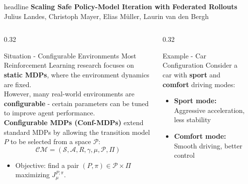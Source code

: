 \documentclass[final,t]{beamer}
\newcommand{\postertitle}{Scaling Safe Policy-Model Iteration with Federated Rollouts}
\newcommand{\posterauthors}{Julius Landes, Christoph Mayer, Elias M\"uller, Laurin van den Bergh}
\begin{document}
\begin{frame}[t]

\vspace{1cm}
\begin{beamercolorbox}[wd=\textwidth,ht=7cm,center]{headline}
\vspace{0.8cm}
{\Huge\textbf{\postertitle}}\\[0.4cm]
{\Large \posterauthors}\\[0.8cm]
\end{beamercolorbox}

\vspace{0.5cm}

\begin{columns}[T]

\begin{column}{0.32\textwidth}
\begin{block}{Situation - Configurable Environments}
Most Reinforcement Learning research focuses on \textbf{static MDPs}, where the environment dynamics are fixed.\\[0.3cm]
However, many real-world environments are \textbf{configurable} - certain parameters can be tuned to improve agent performance.\\[0.3cm]
\textbf{Configurable MDPs (Conf-MDPs)} extend standard MDPs by allowing the transition model $P$ to be selected from a space $\mathcal{P}$:
\[
\mathcal{CM} = (\mathcal{S}, \mathcal{A}, R, \gamma, \mu, \mathcal{P}, \Pi)
\]

\begin{itemize}
  \item Objective: find a pair $(P,\pi)\in\mathcal{P}\times\Pi$ maximizing $J_{\mu}^{P,\pi}$.
\end{itemize}

\end{block}
\end{column}

\begin{column}{0.32\textwidth}
\begin{block}{Example - Car Configuration}
Consider a car with \textbf{sport} and \textbf{comfort} driving modes:
\begin{itemize}
    \item \textbf{Sport mode:} Aggressive acceleration, less stability
    \item \textbf{Comfort mode:} Smooth driving, better control
\end{itemize}
\vspace{0.3cm}


\end{block}
\end{column}
\end{columns}
\end{frame}
\end{document}
